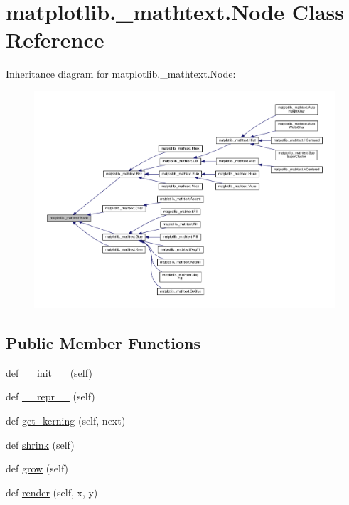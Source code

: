 \hypertarget{classmatplotlib_1_1__mathtext_1_1Node}{}\section{matplotlib.\+\_\+mathtext.\+Node Class Reference}
\label{classmatplotlib_1_1__mathtext_1_1Node}


Inheritance diagram for matplotlib.\+\_\+mathtext.\+Node\+:
\nopagebreak
\begin{figure}[H]
\begin{center}
\leavevmode
\includegraphics[width=350pt]{classmatplotlib_1_1__mathtext_1_1Node__inherit__graph}
\end{center}
\end{figure}
\subsection*{Public Member Functions}
\begin{DoxyCompactItemize}
\item 
def \hyperlink{classmatplotlib_1_1__mathtext_1_1Node_a0b1dc237fb597247eeea9e6f63eddd91}{\+\_\+\+\_\+init\+\_\+\+\_\+} (self)
\item 
def \hyperlink{classmatplotlib_1_1__mathtext_1_1Node_a0f43f698d3fc4086086a4fbf68a22cea}{\+\_\+\+\_\+repr\+\_\+\+\_\+} (self)
\item 
def \hyperlink{classmatplotlib_1_1__mathtext_1_1Node_afe4b9dae7a1e0760ccbe5788f96dd111}{get\+\_\+kerning} (self, next)
\item 
def \hyperlink{classmatplotlib_1_1__mathtext_1_1Node_a75423414e620c37f376678a02c8a6b26}{shrink} (self)
\item 
def \hyperlink{classmatplotlib_1_1__mathtext_1_1Node_a1dfb8faf524f47d53c2e3ef753a509f9}{grow} (self)
\item 
def \hyperlink{classmatplotlib_1_1__mathtext_1_1Node_ab6c96c4199e3d1a4108272c38cfa1e3c}{render} (self, x, y)
\end{DoxyCompactItemize}
